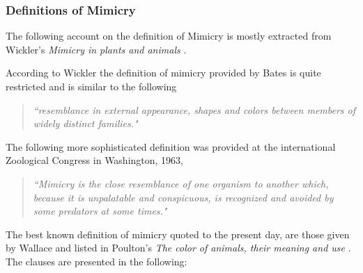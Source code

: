\documentclass[letterpaper]{article}
\numberwithin{equation}{section}
\begin{document}
\subsubsection{Definitions of Mimicry}
The following account on the definition of Mimicry is mostly extracted from Wickler's \textit{Mimicry in plants and animals} \cite{wickler1986}. 

According to Wickler the definition of mimicry provided by Bates \cite{bates1862} is quite restricted and is similar to the following

\begin{quote}
\textsl{``resemblance in external appearance, shapes and colors between members of widely distinct families."}
\end{quote}

The following more sophisticated definition was provided at the international Zoological Congress in Washington, 1963,

\begin{quote}
\textsl{``Mimicry is the close resemblance of one organism to another which, because it is unpalatable and conspicuous, is recognized and avoided by some predators at some times."}
\end{quote}

The best known definition of mimicry quoted to the present day, are those given by Wallace and listed in Poulton's \textit{The color of animals, their meaning and use} \cite{poulton1890colours}. The clauses are presented in the following:
\end{document}
